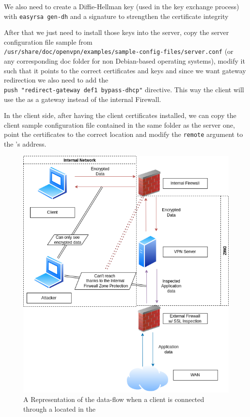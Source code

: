 We also need to create a Diffie-Hellman\cite{diffie-hellman} key (used in the key exchange process) with \verb|easyrsa gen-dh| and a \cite{hmac} signature to strengthen the  certificate integrity\cite{vultr}

After that we just need to install those keys into the server, copy the server configuration file sample from \\
\verb|/usr/share/doc/openvpn/examples/sample-config-files/server.conf| (or\\ any corresponding doc folder for non Debian-based operating systems), modify it such that it points to the correct certificates and keys and since we want gateway redirection we also need to add the \\ \verb|push "redirect-gateway def1 bypass-dhcp"| directive. This way the client will use the  as a gateway instead of the internal Firewall.

In the client side, after having the client certificates installed, we can copy the client sample configuration file contained in the same folder as the server one, point the certificates to the correct location and modify the \verb|remote| argument to the 's  address.

\newpage


\begin{figure}[h!]
 \centering
 \includegraphics[width=13.5cm]{img/VPN_inner_working.png}
 \caption{A Representation of the data-flow when a client is connected through a  located in the }
 \label{fig: Inner Workings}
\end{figure}


